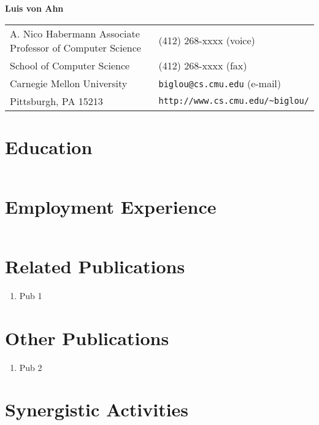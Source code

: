 \documentclass{article}
\newenvironment{denseenumerate}%
	{\begin{enumerate}\setlength{\itemsep}{0pt}\setlength{\parsep}{0pt}}%
	{\end{enumerate}}
\begin{document}
\begin{center}
{\large\bf Luis von Ahn}
\end{center}

\begin{flushleft}
\begin{tabular}{p{3.75in}l}
A. Nico Habermann Associate Professor of Computer Science      & (412) 268-xxxx (voice)\\
School of Computer Science & (412) 268-xxxx (fax)\\
Carnegie Mellon University            & {\tt biglou@cs.cmu.edu} (e-mail)\\
Pittsburgh, PA 15213     & \verb+http://www.cs.cmu.edu/~biglou/+\\
\end{tabular}
\end{flushleft}

\section*{Education}

\begin{tabular}{ll}
\end{tabular}

\section*{Employment Experience}

\begin{tabular}{ll}
\end{tabular}

\section*{Related Publications}

\begin{denseenumerate}
\item Pub 1
\end{denseenumerate}

\section*{Other Publications}

\begin{denseenumerate}
\item Pub 2
\end{denseenumerate}

\section*{Synergistic Activities}
\end{document}
